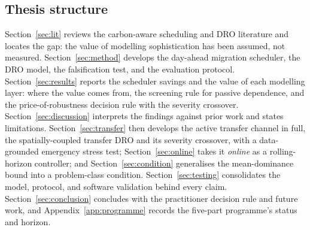 \documentclass[12pt]{article}
\begin{document}
\subsection{Thesis structure}
Section~\ref{sec:lit} reviews the carbon-aware scheduling and DRO literature and
locates the gap: the value of modelling sophistication has been assumed, not
measured. Section~\ref{sec:method} develops the day-ahead migration scheduler, the
DRO model, the falsification test, and the evaluation protocol.
Section~\ref{sec:results} reports the scheduler savings and the value of each
modelling layer: where the value comes from, the screening rule for passive
dependence, and the price-of-robustness decision rule with the severity crossover.
Section~\ref{sec:discussion} interprets the findings against prior work and states
limitations. Section~\ref{sec:transfer} then develops the active transfer channel in
full, the spatially-coupled transfer DRO and its severity crossover, with a
data-grounded emergency stress test; Section~\ref{sec:online} takes it \emph{online}
as a rolling-horizon controller; and Section~\ref{sec:condition} generalises the
mean-dominance bound into a problem-class condition. Section~\ref{sec:testing}
consolidates the model, protocol, and software validation behind every claim.
Section~\ref{sec:conclusion} concludes with the practitioner decision rule and future
work, and Appendix~\ref{app:programme} records the five-part programme's status and
horizon.
\end{document}
